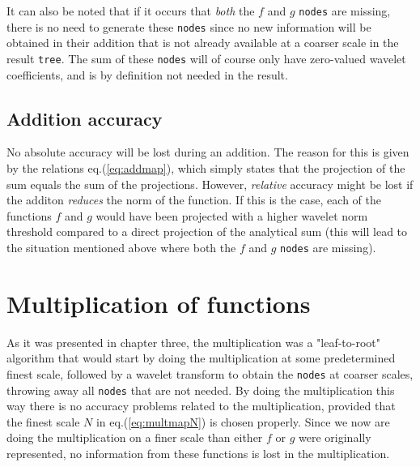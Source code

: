 \noindent
It can also be noted that if it occurs that \emph{both} the $f$ and
$g$ \texttt{nodes} are missing, there is no need to generate these
\texttt{nodes} since no new information will be obtained in their addition that
is not already available at a coarser scale in the result \texttt{tree}. The
sum of these \texttt{nodes} will of course only have zero-valued wavelet
coefficients, and is by definition not needed in the result.

\subsection*{Addition accuracy}
No absolute accuracy will be lost during an addition. The reason for this is 
given by the relations eq.(\ref{eq:addmap}), which simply states that the 
projection of the sum equals the sum of the projections. However, 
\emph{relative} accuracy might be lost if the additon \emph{reduces} the norm
of the function. If this is the case, each of the functions $f$ and $g$ 
would have been projected with a higher wavelet norm threshold
compared to a direct projection of the analytical sum (this will lead to the
situation mentioned above where both the $f$ and $g$ \texttt{nodes} are 
missing).

\section{Multiplication of functions}
As it was presented in chapter three, the multiplication was a
"leaf-to-root" algorithm that would start by doing the multiplication at some
predetermined finest scale, followed by a wavelet transform to obtain the
\texttt{nodes} at coarser scales, throwing away all \texttt{nodes} that are not
needed. By doing the multiplication this way there is no accuracy problems 
related to the multiplication, provided that the finest scale $N$ in 
eq.(\ref{eq:multmapN}) is chosen properly. Since we now are doing the 
multiplication on a finer scale than either $f$ or $g$ were originally 
represented, no information from these functions is lost in the 
multiplication.\\

